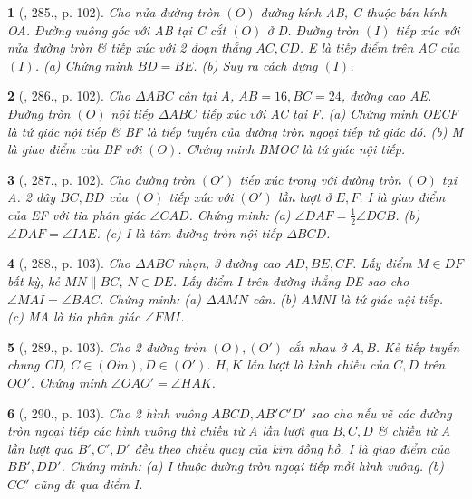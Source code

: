 \documentclass{article}
\newtheorem{baitoan}{}
\begin{document}
\begin{baitoan}[\cite{Binh_Toan_9_tap_2}, 285., p. 102]
	Cho nửa đường tròn $(O)$ đường kính AB, C thuộc bán kính OA. Đường vuông góc với AB tại C cắt $(O)$ ở D. Đường tròn $(I)$ tiếp xúc với nửa đường tròn \& tiếp xúc với 2 đoạn thẳng $AC,CD$. E là tiếp điểm trên AC của $(I)$. (a) Chứng minh $BD = BE$. (b) Suy ra cách dựng $(I)$.
\end{baitoan}

\begin{baitoan}[\cite{Binh_Toan_9_tap_2}, 286., p. 102]
	Cho $\Delta ABC$ cân tại A, $AB = 16,BC = 24$, đường cao AE. Đường tròn $(O)$ nội tiếp $\Delta ABC$ tiếp xúc với AC tại F. (a) Chứng minh OECF là tứ giác nội tiếp \& BF là tiếp tuyến của đường tròn ngoại tiếp tứ giác đó. (b) M là giao điểm của BF với $(O)$. Chứng minh BMOC là tứ giác nội tiếp.
\end{baitoan}

\begin{baitoan}[\cite{Binh_Toan_9_tap_2}, 287., p. 102]
	Cho đường tròn $(O')$ tiếp xúc trong với đường tròn $(O)$ tại A. 2 dây $BC,BD$ của $(O)$ tiếp xúc với $(O')$ lần lượt ở $E,F$. I là giao điểm của EF với tia phân giác $\angle{CAD}$. Chứng minh: (a) $\angle{DAF} = \frac{1}{2}\angle{DCB}$. (b) $\angle{DAF} = \angle{IAE}$. (c) I là tâm đường tròn nội tiếp $\Delta BCD$.
\end{baitoan}

\begin{baitoan}[\cite{Binh_Toan_9_tap_2}, 288., p. 103]
	Cho $\Delta ABC$ nhọn, 3 đường cao $AD,BE,CF$. Lấy điểm $M\in DF$ bất kỳ, kẻ $MN\parallel BC$, $N\in DE$. Lấy điểm I trên đường thẳng DE sao cho $\angle{MAI} = \angle{BAC}$. Chứng minh: (a) $\Delta AMN$ cân. (b) AMNI là tứ giác nội tiếp. (c) MA là tia phân giác $\angle{FMI}$.
\end{baitoan}

\begin{baitoan}[\cite{Binh_Toan_9_tap_2}, 289., p. 103]
	Cho 2 đường tròn $(O),(O')$ cắt nhau ở $A,B$. Kẻ tiếp tuyến chung CD, $C\in(Oin),D\in(O')$. $H,K$ lần lượt là hình chiếu của $C,D$ trên $OO'$. Chứng minh $\angle{OAO'} = \angle{HAK}$.
\end{baitoan}

\begin{baitoan}[\cite{Binh_Toan_9_tap_2}, 290., p. 103]
	Cho 2 hình vuông $ABCD,AB'C'D'$ sao cho nếu vẽ các đường tròn ngoại tiếp các hình vuông thì chiều từ A lần lượt qua $B,C,D$ \& chiều từ A lần lượt qua $B',C',D'$ đều theo chiều quay của kim đồng hồ. I là giao điểm của $BB',DD'$. Chứng minh: (a) I thuộc đường tròn ngoại tiếp mỗi hình vuông. (b) $CC'$ cũng đi qua điểm I.
\end{baitoan}
\end{document}
